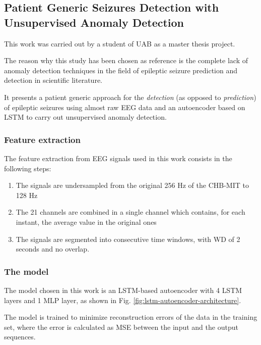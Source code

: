 \subsection[Patient Generic Seizures Detection with Unsupervised\\Anomaly Detection]{Patient Generic Seizures Detection with Unsupervised Anomaly Detection} \label{subsec:refwork-uab}
This work was carried out by a student of \gls{UAB} as a master thesis project.

The reason why this study has been chosen as reference is the complete lack of anomaly detection techniques in the field of epileptic seizure prediction and detection in scientific literature.

It presents a patient generic approach for the \textit{detection} (as opposed to \textit{prediction}) of epileptic seizures using almost raw \gls{EEG} data and an autoencoder based on \gls{LSTM} to carry out unsupervised anomaly detection.
\subsubsection{Feature extraction} \label{subsub:refwork-uab-featext}
The feature extraction from \gls{EEG} signals used in this work consists in the following steps:

\begin{enumerate}
    \item The signals are undersampled from the original 256 Hz of the \gls{CHB-MIT} to 128 Hz
    \item The 21 channels are combined in a single channel which contains, for each instant, the average value in the original ones
    \item The signals are segmented into consecutive time windows, with \gls{WD} of 2 seconds and no overlap.
\end{enumerate}

\subsubsection{The model}
The model chosen in this work is an \gls{LSTM}-based autoencoder with 4 \gls{LSTM} layers and 1 \gls{MLP} layer, as shown in Fig. \ref{fig:lstm-autoencoder-architecture}.

The model is trained to minimize reconstruction errors of the data in the training set, where the error is calculated as \gls{MSE} between the input and the output sequences.

